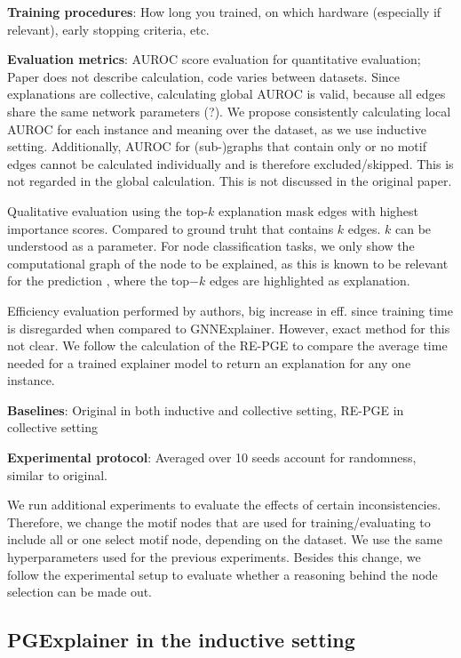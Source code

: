 \textbf{Training procedures}: How long you trained, on which hardware (especially if relevant), early stopping criteria, etc.

\textbf{Evaluation metrics}: AUROC score evaluation for quantitative evaluation; Paper does not describe calculation, code varies between datasets. Since explanations are collective, calculating global AUROC is valid, because all edges share the same network parameters (?). We propose consistently calculating local AUROC for each instance and meaning over the dataset, as we use inductive setting. Additionally, AUROC for (sub-)graphs that contain only or no motif edges cannot be calculated individually and is therefore excluded/skipped. This is not regarded in the global calculation. This is not discussed in the original paper.

Qualitative evaluation using the top-$k$ explanation mask edges with highest importance scores. Compared to ground truht that contains $k$ edges. $k$ can be understood as a parameter. For node classification tasks, we only show the computational graph of the node to be explained, as this is known to be relevant for the prediction \cite{}, where the top$-k$ edges are highlighted as explanation.

Efficiency evaluation performed by authors, big increase in eff. since training time is disregarded when compared to GNNExplainer. However, exact method for this not clear. We follow the calculation of the RE-PGE to compare the average time needed for a trained explainer model to return an explanation for any one instance.

\textbf{Baselines}: Original in both inductive and collective setting, RE-PGE in collective setting

\textbf{Experimental protocol}: Averaged over 10 seeds account for randomness, similar to original.


We run additional experiments to evaluate the effects of certain inconsistencies. Therefore, we change the motif nodes that are used for training/evaluating to include all or one select motif node, depending on the dataset. We use the same hyperparameters used for the previous experiments. Besides this change, we follow the experimental setup to evaluate whether a reasoning behind the node selection can be made out.


\subsection{PGExplainer in the inductive setting}

